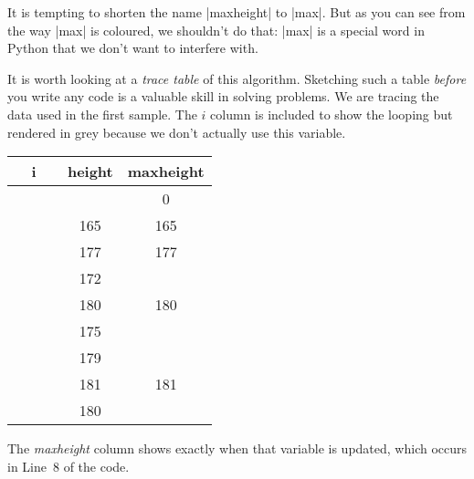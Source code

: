 It is tempting to shorten the name \pycode|maxheight| to \pycode|max|. But as you can see
from the way \pycode|max| is coloured, we shouldn't do that: \pycode|max| is a special
word in Python that we don't want to interfere with.

It is worth looking at a \emph{trace table} of this algorithm. Sketching such a table
\emph{before} you write any code is a valuable skill in solving problems. We are tracing
the data used in the first sample. The $i$ column is included to show the looping but
rendered in grey because we don't actually use this variable.

\begin{inlinetable}
  \begin{tabular}{c S[table-format=3.0] S[table-format=3.0]}
    \toprule
    {~~i~~} & {height} & {maxheight} \\
    \midrule
             &          & 0           \\
     & 165      & 165         \\
     & 177      & 177         \\
     & 172      &             \\
     & 180      & 180         \\
     & 175      &             \\
     & 179      &             \\
     & 181      & 181         \\
     & 180      &             \\
    \bottomrule
  \end{tabular}
\end{inlinetable}

The \emph{maxheight} column shows exactly when that variable is updated, which occurs in
Line~8 of the code.
